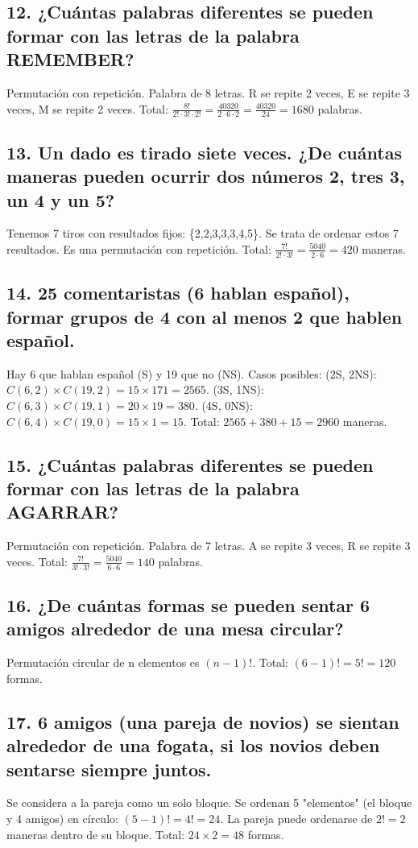 \documentclass[11pt]{article}
\begin{document}
    \subsection*{12. ¿Cuántas palabras diferentes se pueden formar con las letras de la palabra REMEMBER?}
    Permutación con repetición. Palabra de 8 letras. R se repite 2 veces, E se repite 3 veces, M se repite 2 veces.
    Total: $\frac{8!}{2! \cdot 3! \cdot 2!} = \frac{40320}{2 \cdot 6 \cdot 2} = \frac{40320}{24} = 1680$ palabras.

    \subsection*{13. Un dado es tirado siete veces. ¿De cuántas maneras pueden ocurrir dos números 2, tres 3, un 4 y un 5?}
    Tenemos 7 tiros con resultados fijos: \{2,2,3,3,3,4,5\}. Se trata de ordenar estos 7 resultados. Es una permutación con repetición.
    Total: $\frac{7!}{2! \cdot 3!} = \frac{5040}{2 \cdot 6} = 420$ maneras.

    \subsection*{14. 25 comentaristas (6 hablan español), formar grupos de 4 con al menos 2 que hablen español.}
    Hay 6 que hablan español (S) y 19 que no (NS). Casos posibles:
    (2S, 2NS): $C(6,2) \times C(19,2) = 15 \times 171 = 2565$.
    (3S, 1NS): $C(6,3) \times C(19,1) = 20 \times 19 = 380$.
    (4S, 0NS): $C(6,4) \times C(19,0) = 15 \times 1 = 15$.
    Total: $2565 + 380 + 15 = 2960$ maneras.

    \subsection*{15. ¿Cuántas palabras diferentes se pueden formar con las letras de la palabra AGARRAR?}
    Permutación con repetición. Palabra de 7 letras. A se repite 3 veces, R se repite 3 veces.
    Total: $\frac{7!}{3! \cdot 3!} = \frac{5040}{6 \cdot 6} = 140$ palabras.

    \subsection*{16. ¿De cuántas formas se pueden sentar 6 amigos alrededor de una mesa circular?}
    Permutación circular de n elementos es $(n-1)!$.
    Total: $(6-1)! = 5! = 120$ formas.

    \subsection*{17. 6 amigos (una pareja de novios) se sientan alrededor de una fogata, si los novios deben sentarse siempre juntos.}
    Se considera a la pareja como un solo bloque. Se ordenan 5 "elementos" (el bloque y 4 amigos) en círculo: $(5-1)! = 4! = 24$.
    La pareja puede ordenarse de $2! = 2$ maneras dentro de su bloque.
    Total: $24 \times 2 = 48$ formas.
    
\end{document}
